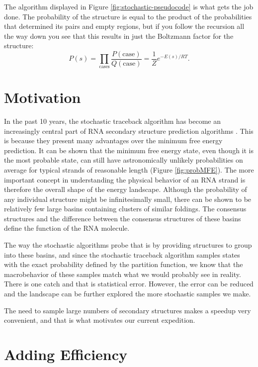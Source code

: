 The algorithm displayed in Figure \ref{fig:stochastic-pseudocode} is
what gets the job done. The probability of the structure is equal to
the product of the probabilities that determined its pairs and empty
regions, but if you follow the recursion all the way down you see that
this results in just the Boltzmann factor for the structure:
\begin{equation}
P(s) = \prod_{\text{cases}} \frac{P(\text{case})}{Q(\text{case})} =
\frac{1}{Z} e^{-E(s)/RT}.
\end{equation}

\section{Motivation}

In the past 10 years, the stochastic traceback algorithm has become an
increasingly central part of RNA secondary structure prediction
algorithms \cite{mathews2006revolutions}. This is because they present
many advantages over the minimum free energy prediction. It can be
shown that the minimum free energy state, even though it is the most
probable state, can still have astronomically unlikely probabilities
on average for typical strands of reasonable length (Figure
\ref{fig:probMFE}). The more important concept in understanding the
physical behavior of an RNA strand is therefore the overall shape of
the energy landscape. Although the probability of any individual
structure might be infinitesimally small, there can be shown to be
relatively few large basins containing clusters of similar foldings.
The consensus structures and the difference between the consensus
structures of these basins define the function of the RNA molecule.

The way the stochastic algorithms probe that is by providing
structures to group into these basins, and since the stochastic
traceback algorithm samples states with the exact probability defined
by the partition function, we know that the macrobehavior of these
samples match what we would probably see in reality. There is one
catch and that is statistical error. However, the error can be reduced
and the landscape can be further explored the more stochastic samples
we make.

The need to sample large numbers of secondary structures makes a
speedup very convenient, and that is what motivates our current
expedition.

\section{Adding Efficiency}

